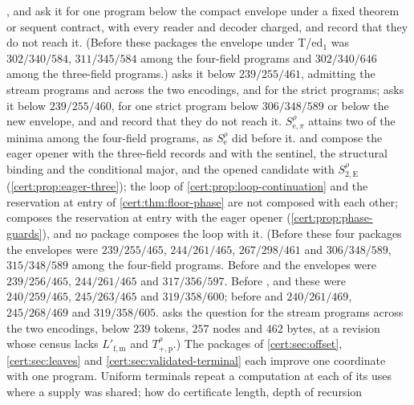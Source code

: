 \begin{question}
,  and  ask
it for one program below the compact envelope under a fixed theorem or sequent contract,
with every reader and decoder charged, and record that they do not reach it.
(Before these packages the envelope under T/ed$_1$ was $302/340/584$, $311/345/584$
among the four-field programs and $302/340/646$ among the three-field programs.)  asks it below $239/255/461$, admitting
the stream programs and across the two encodings, and 
for the strict programs;  asks it below $239/255/460$,
 for one strict program below $306/348/589$ or below the new
envelope, and  and 
record that they do not reach it. $S^{\rho}_{\mathrm e,\pi}$ attains two of the minima
among the four-field programs, as $S^{\rho}_{\mathrm e}$ did before it.  and  compose the
eager opener with the three-field records and with the sentinel, the structural binding
and the conditional major, and  the opened
candidate with $S^{\rho}_{2,\mathrm E}$ (\cref{cert:prop:eager-three}); the loop of
\cref{cert:prop:loop-continuation} and the reservation at entry of
\cref{cert:thm:floor-phase} are not composed with each other; 
composes the reservation at entry with the eager opener
(\cref{cert:prop:phase-guards}), and no package composes the loop with it. (Before these four packages the envelopes were $239/255/465$,
$244/261/465$, $267/298/461$ and $306/348/589$, $315/348/589$ among the four-field
programs. Before  and
 the envelopes were $239/256/465$, $244/261/465$ and
$317/356/597$. Before ,
 and  these were
$240/259/465$, $245/263/465$ and $319/358/600$; before  and
 $240/261/469$, $245/268/469$ and
$319/358/605$.  asks the question for the stream programs
across the two encodings, below $239$ tokens, $257$ nodes and $462$ bytes, at a
revision whose census lacks $L'_{\mathrm{f,m}}$ and $T^{\rho}_{+,\mathrm p}$.) The packages of \cref{cert:sec:offset},
\cref{cert:sec:leaves} and \cref{cert:sec:validated-terminal} each improve one
coordinate with one program. Uniform terminals repeat a computation at each of
its uses where a supply was shared; how do certificate length, depth of recursion

\end{question}
